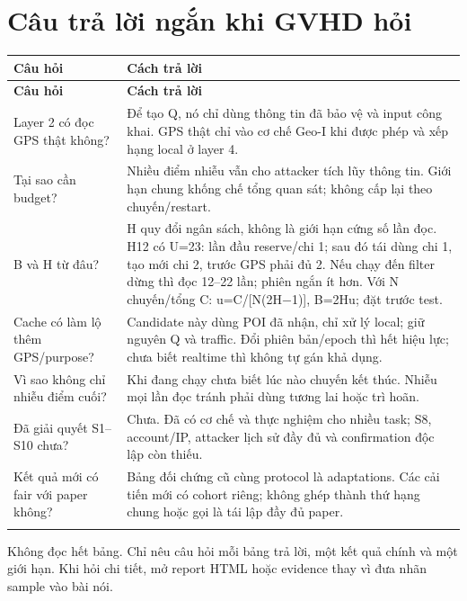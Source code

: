 \documentclass[11pt,a4paper]{article}
\begin{document}
\section*{Câu trả lời ngắn khi GVHD hỏi}
\begingroup\small
\begin{longtable}{@{}P{5.087cm}P{12.023cm}@{}}
\toprule
\textbf{Câu hỏi} & \textbf{Cách trả lời}\\\midrule
\endfirsthead
\toprule
\textbf{Câu hỏi} & \textbf{Cách trả lời}\\\midrule
\endhead\bottomrule\endfoot
Layer 2 có đọc GPS thật không? & Để tạo Q, nó chỉ dùng thông tin đã bảo vệ và input công khai. GPS thật chỉ vào cơ chế Geo-I khi được phép và xếp hạng local ở layer 4.\\
\addlinespace[2pt]
Tại sao cần budget? & Nhiều điểm nhiễu vẫn cho attacker tích lũy thông tin. Giới hạn chung khống chế tổng quan sát; không cấp lại theo chuyến/restart.\\
\addlinespace[2pt]
B và H từ đâu? & H quy đổi ngân sách, không là giới hạn cứng số lần đọc. H12 có U=23: lần đầu reserve/chi 1; sau đó tái dùng chi 1, tạo mới chi 2, trước GPS phải đủ 2. Nếu chạy đến filter dừng thì đọc 12–22 lần; phiên ngắn ít hơn. Với N chuyến/tổng C: u=C/[N(2H−1)], B=2Hu; đặt trước test.\\
\addlinespace[2pt]
Cache có làm lộ thêm GPS/purpose? & Candidate này dùng POI đã nhận, chỉ xử lý local; giữ nguyên Q và traffic. Đổi phiên bản/epoch thì hết hiệu lực; chưa biết realtime thì không tự gán khả dụng.\\
\addlinespace[2pt]
Vì sao không chỉ nhiễu điểm cuối? & Khi đang chạy chưa biết lúc nào chuyến kết thúc. Nhiễu mọi lần đọc tránh phải dùng tương lai hoặc trì hoãn.\\
\addlinespace[2pt]
Đã giải quyết S1–S10 chưa? & Chưa. Đã có cơ chế và thực nghiệm cho nhiều task; S8, account/IP, attacker lịch sử đầy đủ và confirmation độc lập còn thiếu.\\
\addlinespace[2pt]
Kết quả mới có fair với paper không? & Bảng đối chứng cũ cùng protocol là adaptations. Các cải tiến mới có cohort riêng; không ghép thành thứ hạng chung hoặc gọi là tái lập đầy đủ paper.\\
\addlinespace[2pt]
\end{longtable}
\endgroup
Không đọc hết bảng. Chỉ nêu câu hỏi mỗi bảng trả lời, một kết quả chính và một giới hạn. Khi hỏi chi tiết, mở report HTML hoặc evidence thay vì đưa nhãn sample vào bài nói.
\end{document}
